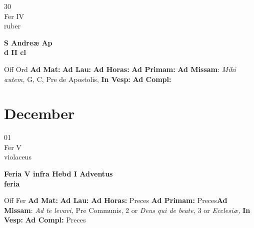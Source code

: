 \documentclass[10pt, openany]{book}
\begin{document}
    \begin{center}
        \begin{minipage}{3.5in}
            \vspace{2em}
            \begin{minipage}{0.5in}
                {\Huge 30} \\
                {\normalsize Fer IV} \\
                {\normalsize ruber}
            \end{minipage}
            \begin{minipage}{3.0in}
                \textbf{ \large S Andreæ Ap \\
                \textnormal{\normalsize d II cl}} \\ 
            \end{minipage}
            \begin{justify}Off Ord
                \textbf{Ad Mat: }
                \textbf{Ad Lau: }
                \textbf{Ad Horas: }
                \textbf{Ad Primam: }\textbf{Ad Missam}: \textit{Mihi autem,} G, C, Pre de Apostolis,  
                \textbf{In Vesp: }
                \textbf{Ad Compl: }
            \end{justify}
        \end{minipage}
    \end{center}

    \chapter{December}
                    
    \begin{center}
        \begin{minipage}{3.5in}
            \vspace{2em}
            \begin{minipage}{0.5in}
                {\Huge 01} \\
                {\normalsize Fer V} \\
                {\normalsize violaceus}
            \end{minipage}
            \begin{minipage}{3.0in}
                \textbf{ \large Feria V infra Hebd I Adventus \\
                \textnormal{\normalsize feria}} \\ 
            \end{minipage}
            \begin{justify}Off Fer
                \textbf{Ad Mat: }
                \textbf{Ad Lau: }
                \textbf{Ad Horas: }Preces
                \textbf{Ad Primam: }Preces\textbf{Ad Missam}: \textit{Ad te levavi,} Pre Communis, 2 or \textit{Deus qui de beate,} 3 or \textit{Ecclesiæ,}  
                \textbf{In Vesp: }
                \textbf{Ad Compl: }Preces
            \end{justify}
        \end{minipage}
    \end{center}
\end{document}
